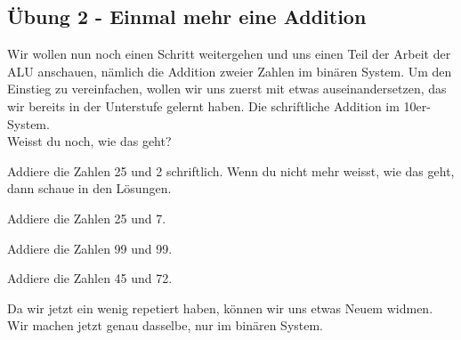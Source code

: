 \subsection{Übung 2 - Einmal mehr eine Addition}
Wir wollen nun noch einen Schritt weitergehen  und uns einen Teil der Arbeit der \gls{ALU} anschauen,
nämlich die Addition zweier Zahlen im binären System. Um den Einstieg zu vereinfachen, wollen wir uns zuerst mit
etwas auseinandersetzen, das wir bereits in der Unterstufe gelernt haben. Die schriftliche Addition im 10er-System.\\
Weisst du noch, wie das geht?\\
\begin{exerciseseries}[columns=1,solsubrule=\hrule]{}
    \begin{exercise}
        Addiere die Zahlen 25 und 2 schriftlich. Wenn du nicht mehr weisst, wie das geht, dann schaue in den Lösungen.
        \vspace{5cm}
    \end{exercise}
    \begin{solution}
    \end{solution}
    \begin{exercise}
        Addiere die Zahlen 25 und 7.
        \vspace{5cm}
    \end{exercise}
    \begin{solution}
    \end{solution}
    \begin{exercise}
        Addiere die Zahlen 99 und 99.
        \vspace{5cm}
    \end{exercise}
    \begin{solution}
    \end{solution}
    \begin{exercise}
        Addiere die Zahlen 45 und 72.
        \vspace{5cm}
    \end{exercise}
    \begin{solution}
    \end{solution}
\end{exerciseseries}
\newpage
Da wir jetzt ein wenig repetiert haben, können wir uns etwas Neuem widmen. Wir machen jetzt genau dasselbe, nur
im binären System.


